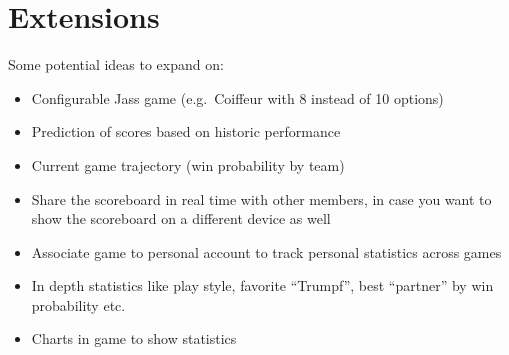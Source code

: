 \section*{Extensions}
Some potential ideas to expand on:
\begin{itemize}
    \item Configurable Jass game (e.g.\ Coiffeur with 8 instead of 10 options)
    \item Prediction of scores based on historic performance
    \item Current game trajectory (win probability by team)
    \item Share the scoreboard in real time with other members, in case you want to show the scoreboard on a different device as well
    \item Associate game to personal account to track personal statistics across games
    \item In depth statistics like play style, favorite ``Trumpf'', best ``partner'' by win probability etc.
    \item Charts in game to show statistics
\end{itemize}
